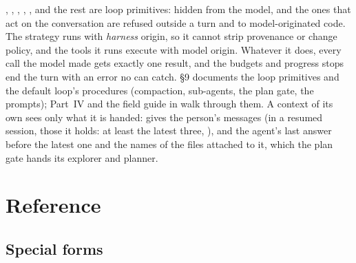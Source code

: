 , , ,
, ,  and the rest
are loop primitives: hidden from the model, and the ones that act on the
conversation are refused outside a turn and to model-originated code. The
strategy runs with \emph{harness} origin, so it cannot strip provenance or
change policy, and the tools it runs execute with model origin. Whatever it
does, every call the model made gets exactly one result, and the budgets
and progress stops end the turn with an error no  can catch.
 \S9 documents the loop primitives and the default
loop's procedures (compaction, sub-agents, the plan gate, the prompts);
Part~IV and the field guide in  walk through them. A
context of its own sees only what it is handed: 
gives the person's messages (in a resumed session, those it holds: at least
the latest three, ), and  the agent's last
answer before the latest one and the names of the files attached to it,
which the plan gate hands its explorer and planner.

\chapter{Reference}\label{sch:reference}

\section{Special forms}

